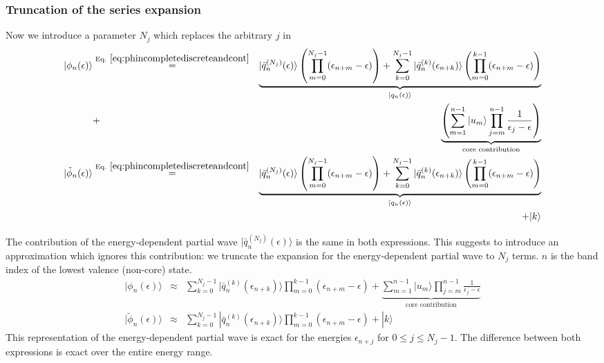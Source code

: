 \documentclass[11pt,a4paper]{report}
\begin{document}
\subsubsection{Truncation of the series expansion}
Now we introduce a parameter $N_j$ which replaces the arbitrary $j$
in 
\begin{eqnarray}
|\phi_n(\epsilon)\rangle
&\eqrel{eq:phincompletediscreteandcont}{=}&
\underbrace{
|\bar{q}_n^{(N_j)}(\epsilon)\rangle
\left(\prod_{m=0}^{N_j-1}(\epsilon_{n+m}-\epsilon)\right)
+
\sum_{k=0}^{N_j-1}
|\bar{q}_{n}^{(k)}(\epsilon_{n+k})\rangle
\left(\prod_{m=0}^{k-1}(\epsilon_{n+m}-\epsilon)\right)
}_{|q_n(\epsilon)\rangle}
\nonumber\\
&+&
\underbrace{
\left(\sum_{m=1}^{n-1}|u_m\rangle\prod_{j=m}^{n-1}\frac{1}{\epsilon_j-\epsilon}\right)
}_{\text{core contribution}}
\label{eq:phinofeexact}
\\
|\tilde{\phi}_n(\epsilon)\rangle
&\eqrel{eq:phincompletediscreteandcont}{=}&
\underbrace{
|\bar{q}_n^{(N_j)}(\epsilon)\rangle
\left(\prod_{m=0}^{N_j-1}(\epsilon_{n+m}-\epsilon)\right)
+
\sum_{k=0}^{N_j-1}
|\bar{q}_{n}^{(k)}(\epsilon_{n+k})\rangle
\left(\prod_{m=0}^{k-1}(\epsilon_{n+m}-\epsilon)\right)
}_{|q_n(\epsilon)\rangle}
\nonumber\\
&&+|k\rangle
\label{eq:phitildenofeexact}
\end{eqnarray}

The contribution of the energy-dependent partial wave
$|\bar{q}_n^{(N_j)}(\epsilon)\rangle$ is the same in both expressions.
This suggests to introduce an approximation which ignores this
contribution: we truncate the expansion for the energy-dependent
partial wave to $N_j$ terms. $n$ is the band index of the lowest
valence (non-core) state.
\begin{eqnarray}
|\phi_n(\epsilon)\rangle
&\approx&
\sum_{k=0}^{N_j-1}
|\bar{q}_{n}^{(k)}(\epsilon_{n+k})\rangle
\prod_{m=0}^{k-1}(\epsilon_{n+m}-\epsilon)
+
\underbrace{
\sum_{m=1}^{n-1}|u_m\rangle\prod_{j=m}^{n-1}\frac{1}{\epsilon_j-\epsilon}
}_{\text{core contribution}}
\nonumber\\
|\tilde{\phi}_n(\epsilon)\rangle
&\approx&
\sum_{k=0}^{N_j-1}
|\bar{q}_{n}^{(k)}(\epsilon_{n+k})\rangle
\prod_{m=0}^{k-1}(\epsilon_{n+m}-\epsilon)
+|k\rangle
\label{eq:truncatedpspartialwithk}
\end{eqnarray}
This representation of the energy-dependent partial wave is exact for
the energies $\epsilon_{n+j}$ for $0\le j\le N_j-1$. The difference
between both expressions is exact over the entire energy range.
\end{document}
